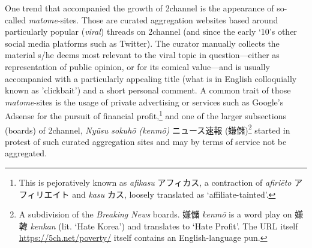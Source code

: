 \documentclass[10pt,british,A4paper,,openany]{memoir}
\begin{document}
One trend that accompanied the growth of 2channel is the appearance of
so-called \emph{matome}-sites. Those are curated aggregation websites
based around particularly popular (\emph{viral}) threads on 2channel
(and since the early `10's other social media platforms such as
Twitter). The curator manually collects the material s/he deems most
relevant to the viral topic in question---either as representation of
public opinion, or for its comical value---and is usually accompanied
with a particularly appealing title (what is in English colloquially
known as 'clickbait') and a short personal comment. A common trait of
those \emph{matome}-sites is the usage of private advertising or
services such as Google's Adsense for the pursuit of financial
profit,\footnote{This is pejoratively known as \emph{afikasu}
  アフィカス, a contraction of \emph{afiriēto} アフィリエイト and
  \emph{kasu} カス, loosely translated as `affiliate-tainted'.} and one
of the larger subsections (boards) of 2channel, \emph{Nyūsu sokuhō
(kenmō)} ニュース速報 (嫌儲)\footnote{A subdivision of the
  \emph{Breaking News} boards. 嫌儲 \emph{kenmō} is a word play on 嫌韓
  \emph{kenkan} (lit. `Hate Korea') and translates to `Hate Profit'. The
  URL itself \url{https://5ch.net/poverty/} itself contains an
  English-language pun.} started in protest of such curated aggregation
sites and may by terms of service not be aggregated.
\end{document}
